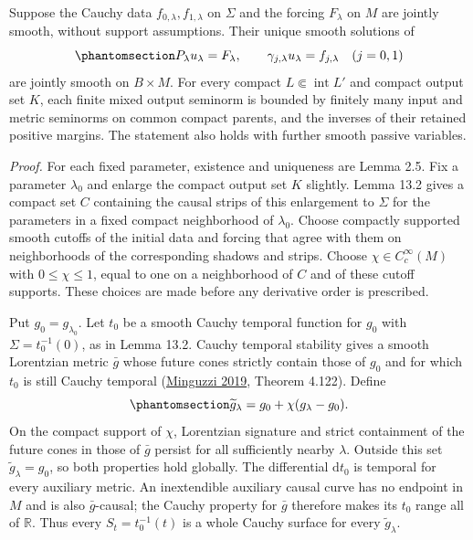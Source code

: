 \documentclass[
  english,
  11pt,
  reqno]{amsart}
\begin{document}
Suppose the Cauchy data \(f_{0,\lambda},f_{1,\lambda}\) on \(\Sigma\)
and the forcing \(F_\lambda\) on \(M\) are jointly smooth, without
support assumptions. Their unique smooth solutions of
\begin{equation}\protect\phantomsection\label{eq:family-inhomogeneous-cauchy-problem}{
P_\lambda u_\lambda=F_\lambda,
\qquad
\gamma_{j,\lambda}u_\lambda=f_{j,\lambda}
\quad(j=0,1)
}\end{equation} are jointly smooth on \(B\times M\). For every compact
\(L\Subset\operatorname{int}L'\) and compact output set \(K\), each
finite mixed output seminorm is bounded by finitely many input and
metric seminorms on common compact parents, and the inverses of their
retained positive margins. The statement also holds with further smooth
passive variables.

\emph{Proof.} For each fixed parameter, existence and uniqueness are
Lemma 2.5. Fix a parameter \(\lambda_0\) and enlarge the compact output
set \(K\) slightly. Lemma 13.2 gives a compact set \(C\) containing the
causal strips of this enlargement to \(\Sigma\) for the parameters in a
fixed compact neighborhood of \(\lambda_0\). Choose compactly supported
smooth cutoffs of the initial data and forcing that agree with them on
neighborhoods of the corresponding shadows and strips. Choose
\(\chi\in C_c^\infty(M)\) with \(0\le\chi\le1\), equal to one on a
neighborhood of \(C\) and of these cutoff supports. These choices are
made before any derivative order is prescribed.

Put \(g_0=g_{\lambda_0}\). Let \(t_0\) be a smooth Cauchy temporal
function for \(g_0\) with \(\Sigma=t_0^{-1}(0)\), as in Lemma 13.2.
Cauchy temporal stability gives a smooth Lorentzian metric \(\bar g\)
whose future cones strictly contain those of \(g_0\) and for which
\(t_0\) is still Cauchy temporal (\hyperref[ref-Minguzzi2019]{Minguzzi
2019}, Theorem 4.122). Define
\begin{equation}\protect\phantomsection\label{eq:family-auxiliary-metric}{
\widetilde g_\lambda
=g_0+\chi(g_\lambda-g_0).
}\end{equation} On the compact support of \(\chi\), Lorentzian signature
and strict containment of the future cones in those of \(\bar g\)
persist for all sufficiently nearby \(\lambda\). Outside this set
\(\widetilde g_\lambda=g_0\), so both properties hold globally. The
differential \(\mathrm dt_0\) is temporal for every auxiliary metric. An
inextendible auxiliary causal curve has no endpoint in \(M\) and is also
\(\bar g\)-causal; the Cauchy property for \(\bar g\) therefore makes
its \(t_0\) range all of \(\mathbb R\). Thus every \(S_t=t_0^{-1}(t)\)
is a whole Cauchy surface for every \(\widetilde g_\lambda\).
\end{document}
